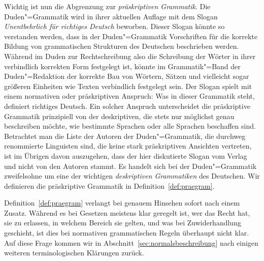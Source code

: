 
Wichtig ist nun die Abgrenzung zur \textit{präskriptiven Grammatik}.
Die Duden"=Grammatik \citep{Duden8} wird in ihrer aktuellen Auflage mit dem Slogan \textit{Unentbehrlich für richtiges Deutsch} beworben.
Dieser Slogan könnte so verstanden werden, dass in der Duden"=Grammatik Vorschriften für die korrekte Bildung von grammatischen Strukturen des Deutschen beschrieben werden.
Während im Duden zur Rechtschreibung also die Schreibung der Wörter in ihrer verbindlich korrekten Form festgelegt ist, könnte im Grammatik"=Band der Duden"=Redaktion der korrekte Bau von Wörtern, Sätzen und vielleicht sogar größeren Einheiten wie Texten verbindlich festgelegt sein.
Der Slogan spielt mit einem normativen oder präskriptiven Anspruch:
Was in dieser Grammatik steht, definiert richtiges Deutsch.
Ein solcher Anspruch unterscheidet die präskriptive Grammatik prinzipiell von der deskriptiven, die stets nur möglichst genau beschreiben möchte, wie bestimmte Sprachen oder alle Sprachen beschaffen sind.
Betrachtet man die Liste der Autoren der Duden"=Grammatik, die durchweg renommierte Linguisten sind, die keine stark präskriptiven Ansichten vertreten, ist im Übrigen davon auszugehen, dass der hier diskutierte Slogan vom Verlag und nicht von den Autoren stammt. 
Es handelt sich bei der Duden"=Grammatik zweifelsohne um eine der wichtigen \textit{deskriptiven Grammatiken} des Deutschen.
Wir definieren die präskriptive Grammatik in Definition~\ref{def:praegram}.


Definition~\ref{def:praegram} verlangt bei genauem Hinsehen sofort nach einem Zusatz.
Während es bei Gesetzen meistens klar geregelt ist, wer das Recht hat, sie zu erlassen, in welchem Bereich sie gelten, und was bei Zuwiderhandlung geschieht, ist dies bei normativen grammatischen Regeln überhaupt nicht klar.
Auf diese Frage kommen wir in Abschnitt~\ref{sec:normalsbeschreibung} nach einigen weiteren terminologischen Klärungen zurück.

